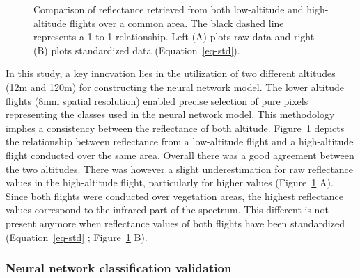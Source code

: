 \documentclass[
  number]{elsarticle}
\begin{document}
\label{cell-fig-CompareRef}
\begin{figure}[H]


\caption{\label{fig-CompareRef}Comparison of reflectance retrieved from
both low-altitude and high-altitude flights over a common area. The
black dashed line represents a 1 to 1 relationship. Left (A) plots raw
data and right (B) plots standardized data (Equation~\ref{eq-std}).}

\end{figure}%

In this study, a key innovation lies in the utilization of two different
altitudes (12m and 120m) for constructing the neural network model. The
lower altitude flights (8mm spatial resolution) enabled precise
selection of pure pixels representing the classes used in the neural
network model. This methodology implies a consistency between the
reflectance of both altitude. Figure~\ref{fig-CompareRef} depicts the
relationship between reflectance from a low-altitude flight and a
high-altitude flight conducted over the same area. Overall there was a
good agreement between the two altitudes. There was however a slight
underestimation for raw reflectance values in the high-altitude flight,
particularly for higher values (Figure~\ref{fig-CompareRef} A). Since
both flights were conducted over vegetation areas, the highest
reflectance values correspond to the infrared part of the spectrum. This
different is not present anymore when reflectance values of both flights
have been standardized (Equation~\ref{eq-std} ;
Figure~\ref{fig-CompareRef} B).

\subsubsection{Neural network classification
validation}\label{neural-network-classification-validation}
\end{document}
